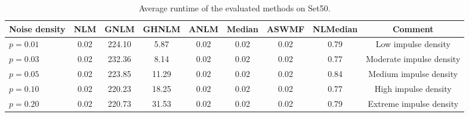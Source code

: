 \begin{table}[!t]
\centering
\caption{Average runtime of the evaluated methods on Set50.}
\label{tab:runtime-set50}
\scriptsize
\begin{tabular}{lcccccccc}
\toprule
Noise density & NLM & GNLM & GHNLM & ANLM & Median & ASWMF & NLMedian & Comment \\
\midrule
\(p=0.01\) & 0.02 & 224.10 & 5.87 & 0.02 & 0.02 & 0.02 & 0.79 & Low impulse density \\
\(p=0.03\) & 0.02 & 232.36 & 8.14 & 0.02 & 0.02 & 0.02 & 0.77 & Moderate impulse density \\
\(p=0.05\) & 0.02 & 223.85 & 11.29 & 0.02 & 0.02 & 0.02 & 0.84 & Medium impulse density \\
\(p=0.10\) & 0.02 & 220.23 & 18.25 & 0.02 & 0.02 & 0.02 & 0.77 & High impulse density \\
\(p=0.20\) & 0.02 & 220.73 & 31.53 & 0.02 & 0.02 & 0.02 & 0.79 & Extreme impulse density \\
\bottomrule
\end{tabular}
\end{table}